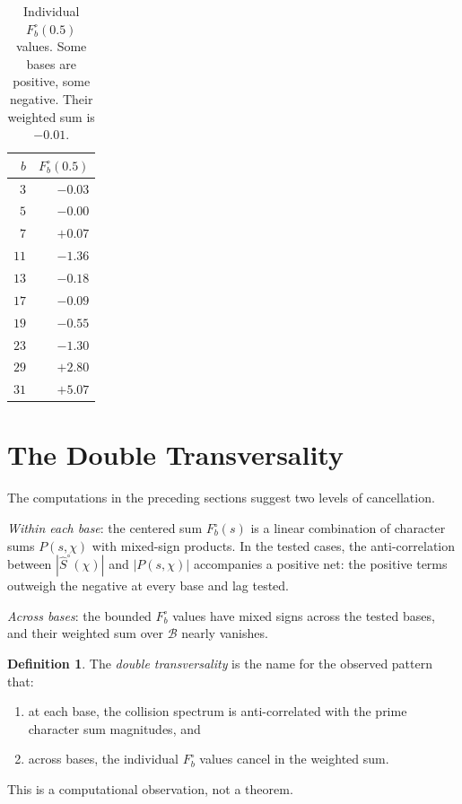 \documentclass[12pt]{amsart}
\theoremstyle{definition}
\newtheorem{definition}[theorem]{Definition}
\theoremstyle{remark}
\begin{document}
\begin{table}[h]
\centering
\begin{tabular}{rr}
\toprule
$b$ & $F^{\circ}_b(0.5)$ \\
\midrule
$3$ & $-0.03$ \\
$5$ & $-0.00$ \\
$7$ & $+0.07$ \\
$11$ & $-1.36$ \\
$13$ & $-0.18$ \\
$17$ & $-0.09$ \\
$19$ & $-0.55$ \\
$23$ & $-1.30$ \\
$29$ & $+2.80$ \\
$31$ & $+5.07$ \\
\bottomrule
\end{tabular}
\caption{Individual $F^{\circ}_b(0.5)$ values.
Some bases are positive, some negative. Their
weighted sum is $-0.01$.}
\label{tab:ind}
\end{table}

\section{The Double Transversality}

The computations in the preceding sections suggest two
levels of cancellation.

\emph{Within each base}: the centered sum
$F^{\circ}_b(s)$ is a linear combination of character
sums $P(s, \chi)$ with mixed-sign products. In the
tested cases, the anti-correlation between
$|\hat{S}^{\circ}(\chi)|$ and $|P(s, \chi)|$
accompanies a positive net: the positive terms
outweigh the negative at every base and lag tested.

\emph{Across bases}: the bounded $F^{\circ}_b$ values
have mixed signs across the tested bases, and their
weighted sum over $\mathcal{B}$ nearly vanishes.

\begin{definition}
The \emph{double transversality} is the name for the
observed pattern that:
\begin{enumerate}
\item at each base, the collision spectrum is
anti-correlated with the prime character sum
magnitudes, and
\item across bases, the individual $F^{\circ}_b$
values cancel in the weighted sum.
\end{enumerate}
This is a computational observation, not a theorem.
\end{definition}
\end{document}
